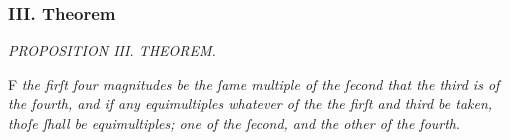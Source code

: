 \documentclass[11pt,preview]{standalone}
\begin{document}
\newcommand{\yellowsquares}{\yellowsquare\hspace{-0.75ex}\yellowsquare}
\newcommand{\redsquares}{\redsquare\hspace{-0.75ex}\redsquare\hspace{-0.75ex}\redsquare\hspace{-0.75ex}\redsquare}
\newcommand{\blackdiamonds}{\blackdiamond\hspace{-0.75ex}\blackdiamond}
\newcommand{\bluediamonds}{\bluediamond\hspace{-0.75ex}\bluediamond\hspace{-0.75ex}\bluediamond\hspace{-0.75ex}\bluediamond}

\subsubsection{III. Theorem}

\begin{minipage}{\textwidth}
    \begin{center}
        \textit{PROPOSITION III. THEOREM.}\label{book5pr3} \\
    \end{center}

    \hfill

    \begin{center}
        \raggedright \lettrine[lines=3, loversize=1, nindent=0pt]{}{}F \textit{the firſt four magnitudes be the ſame multiple of the ſecond that the third is of the fourth, and if any equimultiples whatever of the the firſt and third be taken, thoſe ſhall be equimultiples; one of the ſecond, and the other of the fourth}.
    \end{center}
\end{minipage}

\hfill

\hfill
\end{document}
